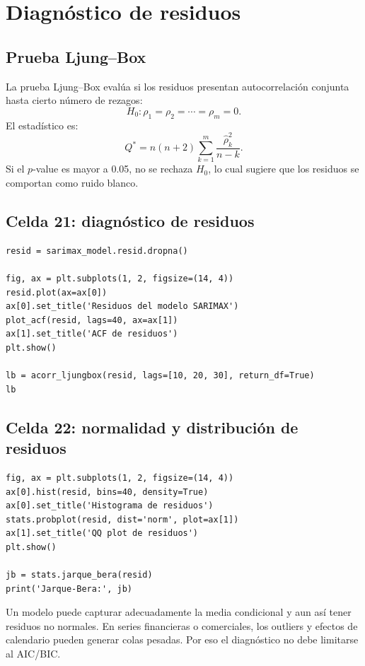 \documentclass[11pt,letterpaper]{article}
\begin{document}
\section{Diagnóstico de residuos}

\subsection{Prueba Ljung--Box}

\begin{latexcell}
La prueba Ljung--Box evalúa si los residuos presentan autocorrelación conjunta hasta cierto número de rezagos:
\[
H_0: \rho_1=\rho_2=\cdots=\rho_m=0.
\]
El estadístico es:
\[
Q^*=n(n+2)\sum_{k=1}^{m}\frac{\hat\rho_k^2}{n-k}.
\]
Si el \(p\)-value es mayor a 0.05, no se rechaza \(H_0\), lo cual sugiere que los residuos se comportan como ruido blanco.
\end{latexcell}

\subsection{Celda 21: diagnóstico de residuos}

\begin{lstlisting}[style=pythoncolab]
resid = sarimax_model.resid.dropna()

fig, ax = plt.subplots(1, 2, figsize=(14, 4))
resid.plot(ax=ax[0])
ax[0].set_title('Residuos del modelo SARIMAX')
plot_acf(resid, lags=40, ax=ax[1])
ax[1].set_title('ACF de residuos')
plt.show()

lb = acorr_ljungbox(resid, lags=[10, 20, 30], return_df=True)
lb
\end{lstlisting}

\subsection{Celda 22: normalidad y distribución de residuos}

\begin{lstlisting}[style=pythoncolab]
fig, ax = plt.subplots(1, 2, figsize=(14, 4))
ax[0].hist(resid, bins=40, density=True)
ax[0].set_title('Histograma de residuos')
stats.probplot(resid, dist='norm', plot=ax[1])
ax[1].set_title('QQ plot de residuos')
plt.show()

jb = stats.jarque_bera(resid)
print('Jarque-Bera:', jb)
\end{lstlisting}

\begin{interpretacion}
Un modelo puede capturar adecuadamente la media condicional y aun así tener residuos no normales. En series financieras o comerciales, los outliers y efectos de calendario pueden generar colas pesadas. Por eso el diagnóstico no debe limitarse al AIC/BIC.
\end{interpretacion}
\end{document}
